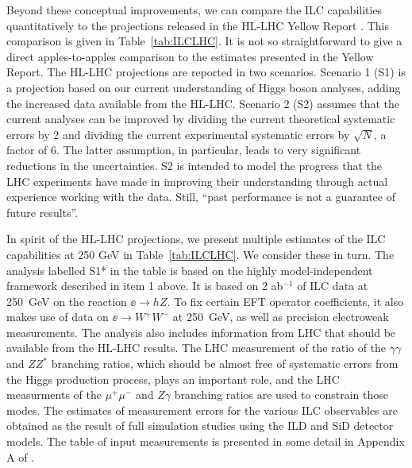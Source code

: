 Beyond these conceptual improvements, we can compare the ILC
capabilities quantitatively to the projections released in the HL-LHC
Yellow Report \cite{YR}.   This comparison is given in
Table~\ref{tab:ILCLHC}.   It is not so straightforward to give a
direct apples-to-apples comparison to the estimates presented in the
Yellow Report.    The HL-LHC projections are reported in two
scenarios.  Scenario 1 (S1) is a projection based on our current
understanding of Higgs boson analyses, adding the increased data
available from the HL-LHC.   Scenario 2 (S2) assumes that the current
analyses can be improved by dividing the current theoretical
systematic errors by 2 and dividing the current experimental
systematic errors by $\sqrt{N}$, a factor of 6.   The latter
assumption, in particular, leads to very significant reductions in the
uncertainties.   S2 is intended to model the progress that the LHC
experiments have made in improving their understanding through actual
experience working with the data.  Still, ``past performance is not a 
guarantee of  future results''.

In spirit of the HL-LHC projections, we present multiple estimates of the ILC
capabilities at 250 GeV  in Table~\ref{tab:ILCLHC}.   We consider
these in turn.   The analysis labelled S1* in the table is based
on the highly model-independent framework described in item 1 above.
It is based on 2 ab$^{-1}$ of ILC data at 250~GeV on the reaction
$\ee\to hZ$.   To fix certain EFT operator coefficients, it also makes
use of data on $\ee \to W^+W^-$ at 250~GeV, as well as precision
electroweak measurements.   The analysis also includes
information from LHC that should be available from the 
HL-LHC results.  The LHC measurement of the ratio of the $\gamma\gamma$ and 
$ZZ^*$ branching ratios, which should be almost free of systematic
errors from the Higgs production process, plays an important role, and
the LHC measurments of the 
$\mu^+\mu^-$ and $Z\gamma$ branching ratios are used to constrain
those modes. 
The estimates of measurement errors
for the various ILC observables  are obtained as the result of  full
simulation studies using the ILD and SiD detector models.   The table
of input measurements is 
presented in some detail in Appendix A of \cite{Barklow:2017suo}. 

